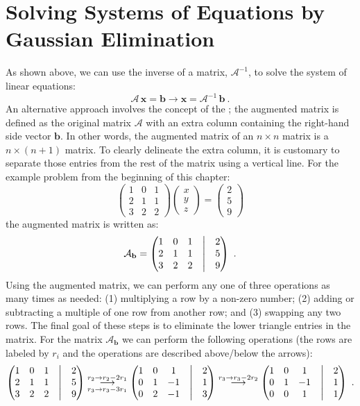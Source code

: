 \section{Solving Systems of Equations by Gaussian Elimination}\label{\chabbr:sec:GaussianElim}
As shown above, we can use the inverse of a matrix, $\mathcal{A}^{-1}$, to solve the system of linear equations:
\[
	\mathcal{A}\,\mathbf{x} = \mathbf{b}\rightarrow \mathbf{x} = \mathcal{A}^{-1}\,\mathbf{b}\ .
\]
An alternative approach involves the concept of the ; the augmented matrix is defined as the original matrix $\mathcal{A}$ with an extra column containing the right-hand side vector $\mathbf{b}$.  In other words, the augmented matrix of an $n\times n$ matrix is a $n\times (n+1)$ matrix. To clearly delineate the extra column, it is customary to separate those entries from the rest of the matrix using a  vertical line. For the example problem from the beginning of this chapter:
\[
	\begin{pmatrix}1&0&1\\ 2&1&1\\ 3&2&2\end{pmatrix}\begin{pmatrix}x\\ y\\ z\end{pmatrix}=\begin{pmatrix}2\\ 5\\ 9\end{pmatrix}
\]
the augmented matrix is written as:
\[
	\mathcal{A}_{\mathbf{b}} = \begin{pmatrix}1&0&1&\bigm|&2\\ 2&1&1&\bigm|&5\\ 3&2&2&\bigm|&9\end{pmatrix}\ .
\]
Using the augmented matrix, we can perform any one of three operations as many times as needed: (1) multiplying a row by a non-zero number; (2) adding or subtracting a multiple of one row from another row; and (3) swapping any two rows.  The final goal of these steps is to eliminate the lower triangle entries in the matrix.  For the matrix $\mathcal{A}_{\mathbf{b}}$ we can perform the following operations (the rows are labeled by $r_i$ and the operations are described above/below the arrows):
{\small
\[
\begin{pmatrix}1&0&1&\bigm|&2\\ 2&1&1&\bigm|&5\\ 3&2&2&\bigm|&9\end{pmatrix}
\underset{r_3\rightarrow r_3-3r_1}{\overset{r_2\rightarrow r_2-2r_1}{\longrightarrow}}
\begin{pmatrix}1&0&1&\bigm| & 2 \\ 0&1&-1 &\bigm| &1\\ 0&2&-1&\bigm| &3\end{pmatrix}
\overset{r_3\rightarrow r_3-2r_2}{\longrightarrow}
\begin{pmatrix}1&0&1&\bigm|&2 \\ 0&1&-1 &\bigm|&1\\ 0&0&1&\bigm|&1\end{pmatrix}\ .
\]
}
